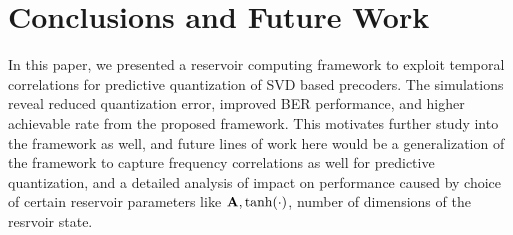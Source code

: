 \documentclass[conference]{IEEEtran}
\begin{document}
\section{Conclusions and Future Work}
\label{section5}
In this paper, we presented a reservoir computing framework to exploit temporal correlations for predictive quantization of SVD based precoders. The simulations reveal reduced quantization error, improved BER performance, and higher achievable rate from the proposed framework. This motivates further study into the framework as well, and future lines of work here would be a generalization of the framework to capture frequency correlations as well for predictive quantization, and a detailed analysis of impact on performance caused by choice of certain reservoir parameters like ${\bf A},\text{tanh}(\cdot)$, number of dimensions of the resrvoir state. 




\renewcommand{\bibfont}{\footnotesize}


\end{document}
